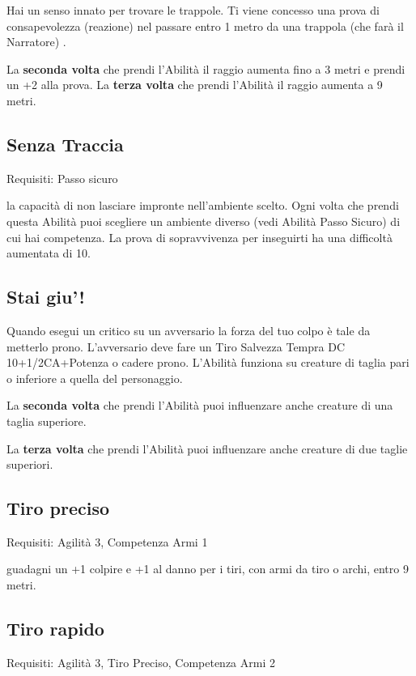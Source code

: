\documentclass[a4paper,11pt,twoside,openany]{book}
\begin{document}
Hai un senso innato per trovare le trappole. Ti viene concesso una prova di consapevolezza (reazione) nel passare entro 1 metro da una trappola (che farà il Narratore) .

La \textbf{seconda volta} che prendi l'Abilità il raggio aumenta fino a 3 metri e prendi un +2 alla prova. La \textbf{terza volta} che prendi l'Abilità il raggio aumenta a 9 metri.

\subsection{Senza Traccia}

Requisiti: Passo sicuro

la capacità di non lasciare impronte nell'ambiente scelto. Ogni volta che prendi questa Abilità puoi scegliere un ambiente diverso (vedi Abilità Passo Sicuro) di cui hai competenza. La prova di sopravvivenza per inseguirti ha una difficoltà aumentata di 10.

\subsection{Stai giu'!}

Quando esegui un critico su un avversario la forza del tuo colpo è tale da metterlo prono. L'avversario deve fare un Tiro Salvezza Tempra DC 10+1/2CA+Potenza o cadere prono. L'Abilità funziona su creature di taglia pari o inferiore a quella del personaggio.

La \textbf{seconda volta} che prendi l'Abilità puoi influenzare anche creature di una taglia superiore.

La \textbf{terza volta} che prendi l'Abilità puoi influenzare anche creature di due taglie superiori.

\subsection{Tiro preciso}

Requisiti: Agilità 3, Competenza Armi 1

guadagni un +1 colpire e +1 al danno per i tiri, con armi da tiro o archi, entro 9 metri.

\subsection{Tiro rapido}

Requisiti: Agilità 3, Tiro Preciso, Competenza Armi 2
\end{document}
